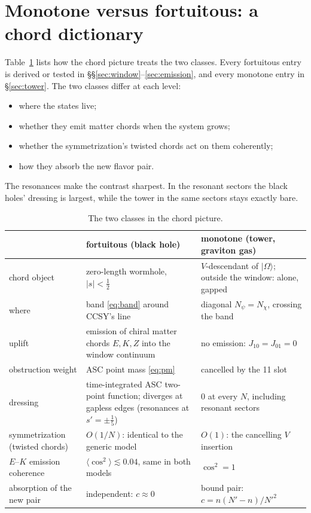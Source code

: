 \documentclass[11pt]{article}
\newcommand{\Np}{N'}
\newcommand{\Om}{|\Omega\rangle}
\newcommand{\sn}{s'}
\theoremstyle{plain}
\theoremstyle{remark}
\numberwithin{equation}{section}
\begin{document}
\section{Monotone versus fortuitous: a chord dictionary}\label{sec:summary}

Table~\ref{tab:summary} lists how the chord picture treats the two classes. Every fortuitous entry is derived or tested in
\S\S\ref{sec:window}--\ref{sec:emission}, and every monotone entry in \S\ref{sec:tower}. The two classes differ at each
level:
\begin{itemize}\itemsep1pt
\item where the states live;
\item whether they emit matter chords when the system grows;
\item whether the symmetrization's twisted chords act on them coherently;
\item how they absorb the new flavor pair.
\end{itemize}
The resonances make the contrast sharpest. In the resonant sectors the black holes' dressing is largest, while the tower
in the same sectors stays exactly bare.

\begin{table}[!ht]
\centering\small
\begin{tabular}{p{3.6cm}p{5.4cm}p{5.4cm}}
\toprule
 & fortuitous (black hole) & monotone (tower, graviton gas)\\
\midrule
chord object & zero-length wormhole, $|s|<\tfrac12$ & $V$-descendant of $\Om$; outside the window: alone, gapped\\
where & band \eqref{eq:band} around CCSY's line & diagonal $N_\psi=N_\chi$, crossing the band\\
uplift & emission of chiral matter chords $E,K,Z$ into the window continuum & no emission: $J_{10}=J_{01}=0$\\
obstruction weight & ASC point mass \eqref{eq:pm} & cancelled by the 11 slot\\
dressing & time-integrated ASC two-point function; diverges at gapless edges (resonances at $\sn=\pm\frac15$) & 0 at every $N$, including resonant sectors\\
symmetrization (twisted chords) & $O(1/N)$: identical to the generic model & $O(1)$: the cancelling $V$ insertion\\
$E$--$K$ emission coherence & $\langle\cos^2\rangle\lesssim0.04$, same in both models & $\cos^2=1$\\
absorption of the new pair & independent: $c\approx0$ & bound pair: $c=n(\Np-n)/\Np^2$\\
\bottomrule
\end{tabular}
\caption{The two classes in the chord picture.}
\label{tab:summary}
\end{table}
\end{document}
